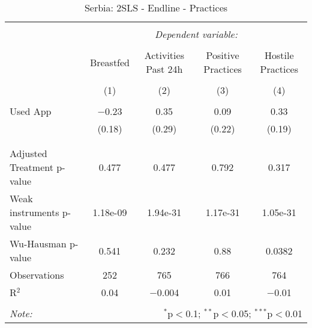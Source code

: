 
\begin{table}[!htbp] \centering 
  \caption{Serbia: 2SLS - Endline - Practices} 
  \label{tbl:Serbia: 2SLS - Endline - Practices} 
\begin{tabular}{@{\extracolsep{5pt}}lcccc} 
\\[-1.8ex]\hline 
\hline \\[-1.8ex] 
 & \multicolumn{4}{c}{\textit{Dependent variable:}} \\ 
\cline{2-5} 
\\[-1.8ex] & Breastfed & Activities Past 24h & Positive Practices & Hostile Practices \\ 
\\[-1.8ex] & (1) & (2) & (3) & (4)\\ 
\hline \\[-1.8ex] 
 Used App & $-$0.23 & 0.35 & 0.09 & 0.33 \\ 
  & (0.18) & (0.29) & (0.22) & (0.19) \\ 
  & & & & \\ 
\hline \\[-1.8ex] 
Adjusted Treatment p-value & 0.477 & 0.477 & 0.792 & 0.317 \\ 
Weak instruments p-value & 1.18e-09 & 1.94e-31 & 1.17e-31 & 1.05e-31 \\ 
Wu-Hausman p-value & 0.541 & 0.232 & 0.88 & 0.0382 \\ 
Observations & 252 & 765 & 766 & 764 \\ 
R$^{2}$ & 0.04 & $-$0.004 & 0.01 & $-$0.01 \\ 
\hline 
\hline \\[-1.8ex] 
\textit{Note:}  & \multicolumn{4}{r}{$^{*}$p$<$0.1; $^{**}$p$<$0.05; $^{***}$p$<$0.01} \\ 
\end{tabular} 
\end{table} 
